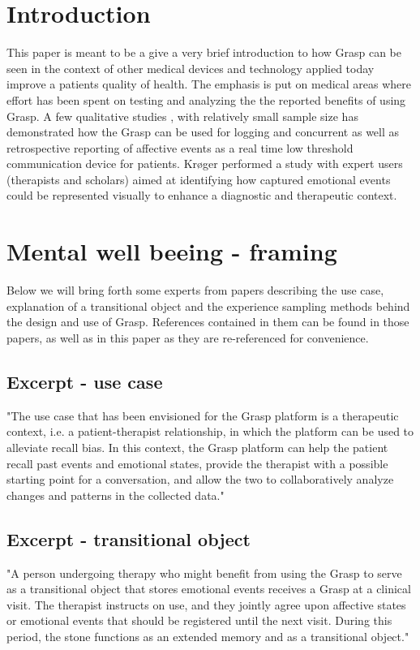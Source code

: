 \section{Introduction}
This paper is meant to be a give a very brief introduction to how Grasp can be seen in the context of other medical devices and technology applied today improve a patients quality of health. The emphasis is put on medical areas  where effort has been spent on testing and analyzing the the reported benefits of using Grasp. A few qualitative studies \cite{Guribye:2018:TID:3173225.3173287}, \cite{guribye2016}  with relatively small sample size has demonstrated how the Grasp can be used for logging and concurrent as well as retrospective reporting of affective events as a real time low threshold communication device for patients. Krøger \cite{kroger2015logging} performed a study with expert users (therapists and scholars) aimed at identifying how captured emotional events could be represented visually to enhance a diagnostic and therapeutic context.

\section{Mental well beeing - framing}
Below we will bring forth some experts from papers describing the use case, explanation of a transitional object and the experience sampling methods behind the design and use of Grasp. References contained in them can be found in those papers, as well as in this paper as they are re-referenced for convenience.

\subsection{Excerpt - use case }

"The use case that has been envisioned for the Grasp platform is a therapeutic context, i.e. a patient-therapist relationship, in which the platform can be used to alleviate recall bias. In this context, the Grasp platform can help the patient recall past events and emotional states, provide the therapist with a possible starting point for a conversation, and allow the two to collaboratively analyze changes and patterns in the collected data." \cite[p.~7]{guribye2016}

\subsection{Excerpt - transitional object }
"A person undergoing therapy who might benefit from using the Grasp to serve as a transitional object \cite{Arthern} that stores emotional events receives a Grasp at a clinical visit. The therapist instructs on use, and they jointly agree upon affective states or emotional events that should be registered until the next visit. During this period, the stone functions as an extended memory and as a transitional object." \cite[p.~7]{guribye2016}

